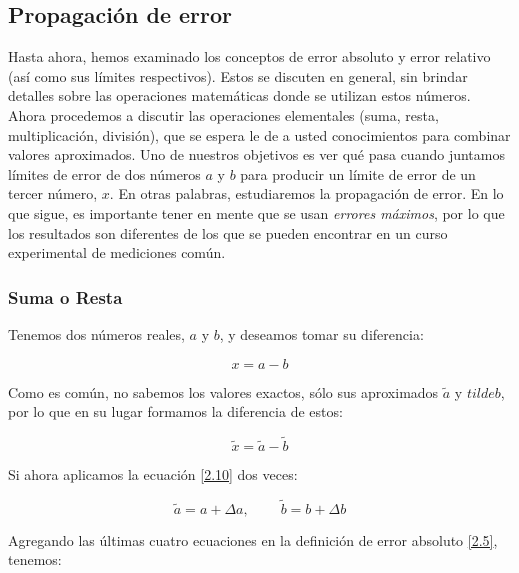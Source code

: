 \documentclass[11pt]{article}
\begin{document}
\hypertarget{propagaciuxf3n-de-error}{%
\subsection{Propagación de error}\label{propagaciuxf3n-de-error}}

Hasta ahora, hemos examinado los conceptos de error absoluto y error
relativo (así como sus límites respectivos). Estos se discuten en
general, sin brindar detalles sobre las operaciones matemáticas donde se
utilizan estos números. Ahora procedemos a discutir las operaciones
elementales (suma, resta, multiplicación, división), que se espera le de
a usted conocimientos para combinar valores aproximados. Uno de nuestros
objetivos es ver qué pasa cuando juntamos límites de error de dos
números \(a\) y \(b\) para producir un límite de error de un tercer
número, \(x\). En otras palabras, estudiaremos la propagación de error.
En lo que sigue, es importante tener en mente que se usan \emph{errores
máximos}, por lo que los resultados son diferentes de los que se pueden
encontrar en un curso experimental de mediciones común.

\hypertarget{suma-o-resta}{%
\subsubsection{Suma o Resta}\label{suma-o-resta}}

Tenemos dos números reales, \(a\) y \(b\), y deseamos tomar su
diferencia:

\[
\begin{equation}
x = a - b \label{2.16}\tag{13}
\end{equation}
\]

Como es común, no sabemos los valores exactos, sólo sus aproximados
\(\tilde{a}\) y \(tilde{b}\), por lo que en su lugar formamos la
diferencia de estos:

\[
\begin{equation}
\tilde{x} = \tilde{a} - \tilde{b} \label{2.17}\tag{14}
\end{equation}
\]

Si ahora aplicamos la ecuación \eqref{2.10} dos veces:

\[
\begin{equation}
\tilde{a} = a + \Delta a, \ \ \ \ \ \ \ \ \ \ \tilde{b} = b + \Delta b \label{2.18}\tag{15}
\end{equation}
\]

Agregando las últimas cuatro ecuaciones en la definición de error
absoluto \eqref{2.5}, tenemos:
\end{document}
